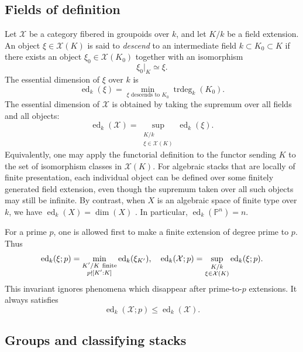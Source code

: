\documentclass[11pt,reqno]{amsart}
\numberwithin{equation}{section}
\theoremstyle{plain}
\theoremstyle{definition}
\def\bP{{\mathbb P}}
\def\ed{{\operatorname{ed}}}
\def\trdeg{{\operatorname{trdeg}}}
\begin{document}
\subsection{Fields of definition}

Let $\mathcal X$ be a category fibered in groupoids over $k$, and let
$K/k$ be a field extension.  An object $\xi\in\mathcal X(K)$ is said to \emph{descend} to an intermediate field $k\subset K_0\subset K$ if there exists an object $\xi_0\in\mathcal X(K_0)$ together with an isomorphism
\[
\xi_0|_K\simeq\xi.
\]
The essential dimension of $\xi$ over $k$ is
\[
\ed_k(\xi)=
\min_{\xi\text{ descends to }K_0}\trdeg_k(K_0).
\]
The essential dimension of $\mathcal X$ is obtained by taking the
supremum over all fields and all objects:
\[
\ed_k(\mathcal X)=
\sup_{\substack{K/k\\ \xi\in\mathcal X(K)}}\ed_k(\xi).
\]
Equivalently, one may apply the functorial definition to the functor
sending $K$ to the set of isomorphism classes in $\mathcal X(K)$.
For algebraic stacks that are locally of finite presentation, each individual
object can be defined over some finitely generated field extension, even though
the supremum taken over all such objects may still be infinite.  By contrast,
when $X$ is an algebraic space of finite type over $k$, we have
$\ed_k(X)=\dim(X)$ \cite[Example~2.4]{BRV}.  In particular,
$\ed_k(\bP^n)=n$.

For a prime $p$, one is allowed first to make a finite extension of
degree prime to $p$.  Thus
\[
\ed_k(\xi;p)=
\min_{\substack{K'/K\ {\rm finite}\\p\nmid[K':K]}}
\ed_k(\xi_{K'}),
\quad
\ed_k(\mathcal X;p)=
\sup_{\substack{K/k\\ \xi\in\mathcal X(K)}}\ed_k(\xi;p).
\]
This invariant ignores phenomena which disappear after prime-to-$p$
extensions.  It always satisfies
\[
\ed_k(\mathcal X;p)\le\ed_k(\mathcal X).
\]

\subsection{Groups and classifying stacks}
\end{document}
